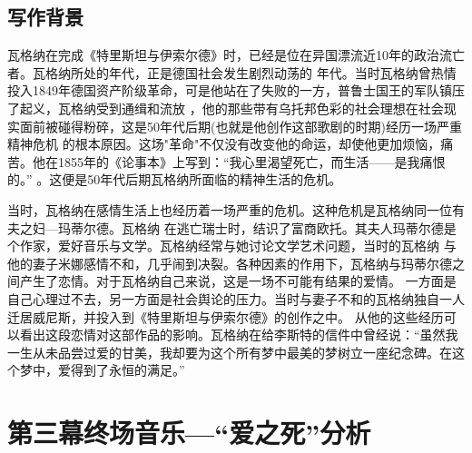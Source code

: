 \documentclass[10pt,a4paper]{ctexart}
\newcommand{\upcite}[1]{\textsuperscript{\textsuperscript{\cite{#1}}}}
\begin{document}
 	\subsection*{写作背景}
    瓦格纳在完成《特里斯坦与伊索尔德》时，已经是位在异国漂流近10年的政治流亡者。瓦格纳所处的年代，正是德国社会发生剧烈动荡的
    年代。当时瓦格纳曾热情投入1849年德国资产阶级革命，可是他站在了失败的一方，普鲁士国王的军队镇压了起义，瓦格纳受到通缉和流放
    ，他的那些带有乌托邦色彩的社会理想在社会现实面前被碰得粉碎，这是50年代后期(也就是他创作这部歌剧的时期)经历一场严重精神危机
    的根本原因。这场"革命"不仅没有改变他的命运，却使他更加烦恼，痛苦。他在1855年的《论事本》上写到：“我心里渴望死亡，而生活——是我痛恨的。”
    \upcite{瓦格纳书信集}。这便是50年代后期瓦格纳所面临的精神生活的危机。

    当时，瓦格纳在感情生活上也经历着一场严重的危机。这种危机是瓦格纳同一位有夫之妇—玛蒂尔德。瓦格纳
    在逃亡瑞士时，结识了富商欧托。其夫人玛蒂尔德是个作家，爱好音乐与文学。瓦格纳经常与她讨论文学艺术问题，当时的瓦格纳
    与他的妻子米娜感情不和，几乎闹到决裂。各种因素的作用下，瓦格纳与玛蒂尔德之间产生了恋情。对于瓦格纳自己来说，这是一场不可能有结果的爱情。
    一方面是自己心理过不去，另一方面是社会舆论的压力。当时与妻子不和的瓦格纳独自一人迁居威尼斯，并投入到《特里斯坦与伊索尔德》的创作之中。
    从他的这些经历可以看出这段恋情对这部作品的影响。瓦格纳在给李斯特的信件中曾经说：“虽然我一生从未品尝过爱的甘美，我却要为这个所有梦中最美的梦树立一座纪念碑。在这个梦中，爱得到了永恒的满足。”\upcite{瓦格纳李斯特}
 	\section*{第三幕终场音乐—“爱之死”分析}
    
    \renewcommand{\refname}{参考文献}
    
\end{document}
